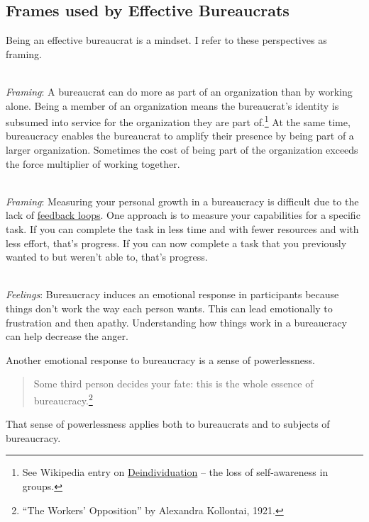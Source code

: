 \subsection*{Frames used by Effective Bureaucrats}

Being an effective bureaucrat is a mindset. I refer to these perspectives as framing. 

\ \\
\textit{Framing}: A bureaucrat can do more as part of an organization than by working alone. Being a member of an organization means the bureaucrat's identity is subsumed into service for the organization they are part of.\footnote{See Wikipedia entry on \href{https://en.wikipedia.org/wiki/Deindividuation}{Deindividuation} -- the loss of self-awareness in groups.
} At the same time, bureaucracy enables the bureaucrat to amplify their presence by being part of a larger organization.  Sometimes the cost of being part of the organization exceeds the force multiplier of working together. 

\ \\
\textit{Framing}: Measuring your personal growth in a bureaucracy is difficult due to the lack of \hyperref[sec:feedback-loop-and-ripples]{feedback loops}. One approach is to measure your capabilities for a specific task. If you can complete the task in less time and with fewer resources and with less effort, that's progress. If you can now complete a task that you previously wanted to but weren't able to, that's progress.


\ \\
\textit{Feelings}: Bureaucracy induces an emotional response in participants because things don't work the way each person wants. This can lead emotionally to frustration and then apathy. Understanding how things work in a bureaucracy can help decrease the anger.


Another emotional response to bureaucracy is a sense of powerlessness. 
\begin{quote}
Some third person decides your fate: this is the whole essence of bureaucracy.\footnote{``The Workers' Opposition'' by Alexandra Kollontai, 1921.}
\end{quote}
That sense of powerlessness applies both to bureaucrats and to subjects of bureaucracy. 

